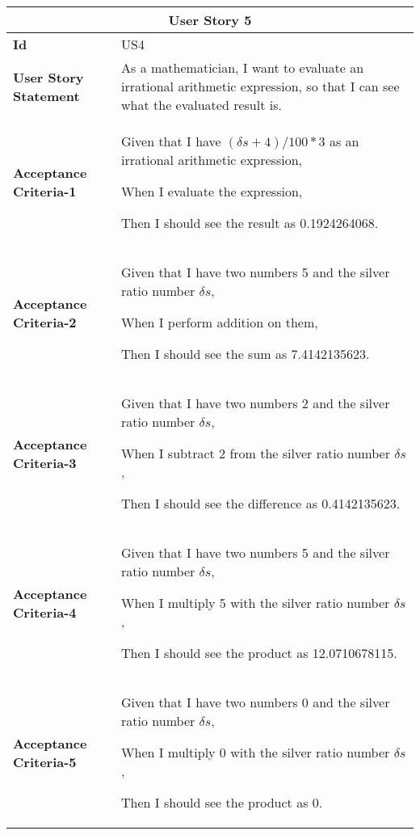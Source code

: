 \hspace{1cm}
\begin{center}
\begin{tabular}{ | m{2.3cm} | m{12cm} | } 

 \hline
 \multicolumn{2}{|c|}{\textbf{User Story 5}} \\

\hline
\textbf{Id} & US4 \\ 

\hline
\textbf{User Story Statement} & As a mathematician, I want to evaluate an irrational arithmetic expression, so that I can see what the evaluated result is. \\ 

\hline
\textbf{Acceptance Criteria-1} & Given that I have ${(\delta s + 4) / 100 * 3}$ as an irrational arithmetic expression,

When I evaluate the expression,

Then I should see the result as 0.1924264068.\\

\hline
\textbf{Acceptance Criteria-2} & Given that I have two numbers 5 and the silver ratio number $\delta s$,

When I perform addition on them,

Then I should see the sum as 7.4142135623.\\

\hline
\textbf{Acceptance Criteria-3} & Given that I have two numbers 2 and the silver ratio number $\delta s$,

When I subtract 2 from the silver ratio number $\delta s$,

Then I should see the difference as 0.4142135623.\\

\hline
\textbf{Acceptance Criteria-4} & Given that I have two numbers 5 and the silver ratio number $\delta s$,

When I multiply 5 with the silver ratio number $\delta s$,

Then I should see the product as 12.0710678115.\\

\hline
\textbf{Acceptance Criteria-5} & Given that I have two numbers 0 and the silver ratio number $\delta s$,

When I multiply 0 with the silver ratio number $\delta s$,

Then I should see the product as 0.\\


\end{tabular}
\end{center}
